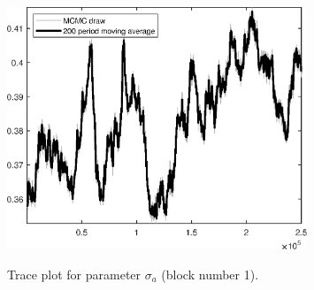 \begin{figure}[H]
\centering
  \includegraphics[width=0.8\textwidth]{BRS_imp_mobility_alt/graphs/TracePlot_sigma_a_blck_1}\\
    \caption{Trace plot for parameter ${\sigma_a}$ (block number 1).}
\end{figure}
